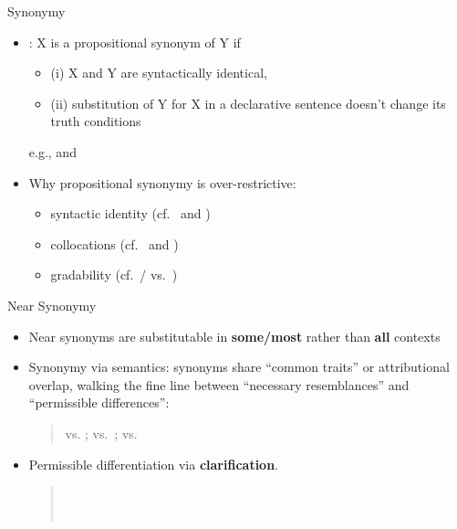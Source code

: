 \documentclass{beamer}
\begin{document}
\begin{frame}{Synonymy}

\begin{itemize}
\item {}: X is a propositional synonym of Y if
  \begin{itemize}
  \item   (i) X and Y are syntactically identical,
  \item (ii) substitution of Y  for X in a declarative sentence doesn't change its truth conditions
  \end{itemize}
  e.g.,  and 
\item Why propositional synonymy is over-restrictive:
  \begin{itemize}
  \item syntactic identity (cf.\  and )
  \item collocations (cf.\  and )
  \item gradability (cf.\ / vs.\ )
  \end{itemize}
\end{itemize}
\end{frame}

\begin{frame}{Near Synonymy}
\begin{itemize}
\item Near synonyms are substitutable in \textbf{some/most} rather than \textbf{all} contexts
\item Synonymy via semantics: synonyms share ``common traits'' or
  attributional overlap, walking the fine line between ``necessary
  resemblances'' and ``permissible differences'':
  \begin{quote}
       vs. ;   vs.\ ;  vs. 
  \end{quote}
\item Permissible differentiation via \textbf{clarification}.
  \begin{quote}
    \\
    \\   
    
  \end{quote}
%
\end{itemize}
\end{frame}
\end{document}
